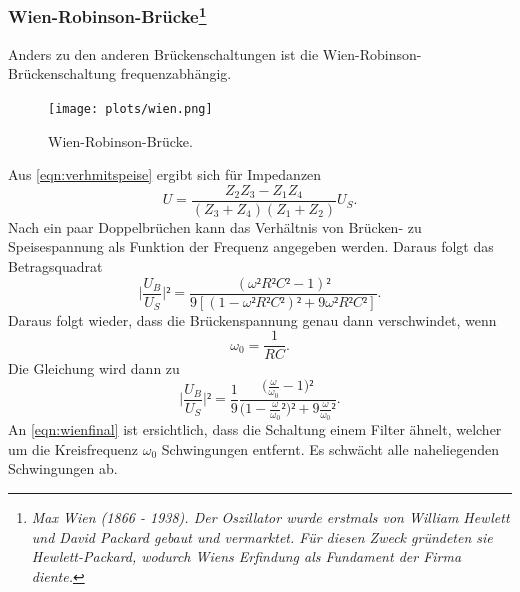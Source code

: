 \subsubsection{Wien-Robinson-Brücke\footnote{\textit{Max Wien (1866 - 1938). Der Oszillator wurde erstmals von William Hewlett und David Packard gebaut und vermarktet. Für diesen Zweck gründeten sie Hewlett-Packard, wodurch Wiens Erfindung als Fundament der Firma diente.}}}
Anders zu den anderen Brückenschaltungen ist die Wien-Robinson-Brückenschaltung frequenzabhängig.
\begin{figure}
    \centering
    \texttt{[image: plots/wien.png]}
    \caption{Wien-Robinson-Brücke.}
    \label{fig:wien}
\end{figure}
Aus \ref{eqn:verhmitspeise} ergibt sich für Impedanzen
\begin{equation*}
    U = \frac{Z_2Z_3 - Z_1Z_4}{(Z_3 + Z_4)(Z_1 + Z_2)}U_S  .
\end{equation*}
Nach ein paar Doppelbrüchen kann das Verhältnis von Brücken- zu Speisespannung als Funktion der Frequenz angegeben werden.
Daraus folgt das Betragsquadrat
\begin{equation}
    \biggl|\frac{U_B}{U_S}\biggr|² = \frac{(\omega ²R²C² - 1)²}{9[(1-\omega ²R²C²)² + 9\omega ²R²C²]}  .
\end{equation}
Daraus folgt wieder, dass die Brückenspannung genau dann verschwindet, wenn 
\begin{equation*}
    \omega_0 = \frac{1}{RC} .
\end{equation*}
Die Gleichung wird dann zu 
\begin{equation}
    \biggl|\frac{U_B}{U_S}\biggr|² = \frac{1}{9}\frac{\biggl(\frac{\omega}{\omega_0}-1\biggr)²}{\biggl(1-\frac{\omega}{\omega_0}²\biggr)² + 9\frac{\omega}{\omega_0}²} .
    \label{eqn:wienfinal}
\end{equation}
An \ref{eqn:wienfinal} ist ersichtlich, dass die Schaltung einem Filter ähnelt, welcher um die Kreisfrequenz $\omega_0$ Schwingungen entfernt.
Es schwächt alle naheliegenden Schwingungen ab.